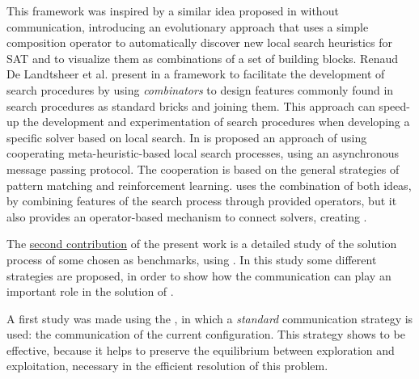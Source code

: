 
This framework was inspired by a similar idea proposed in \cite{Fukunaga2008} without communication, introducing an evolutionary approach that uses a simple composition operator to automatically discover new local search heuristics for SAT and to  visualize them as combinations of a set of building blocks. Renaud De Landtsheer et al. present in \cite{Landtsheer2015} a framework to facilitate the development of search procedures by using \textit{combinators} to design features commonly found in search procedures as standard bricks and joining them. This approach can speed-up the development and experimentation of search procedures when developing a specific solver based on local search. In \cite{Martin2016} is proposed an approach of using cooperating meta-heuristic-based local search processes, using an asynchronous message passing protocol. The cooperation is based on the general strategies of pattern matching and reinforcement learning. \posl{} uses the combination of both ideas, by combining features of the search process through provided operators, but it also provides an operator-based mechanism to connect solvers, creating \comstrs.


The \underline{second contribution} of the present work is a detailed study of the solution process of some \CSPs{} chosen as benchmarks, using \posl{}. In this study some different strategies are proposed, in order to show how the communication can play an important role in the solution of \csps{}.

A first study was made using the \sgp{}, in which a \textit{standard} communication strategy is used: the communication of the current configuration. This strategy shows to be effective, because it helps to preserve the equilibrium between exploration and exploitation, necessary in the efficient resolution of this problem.

